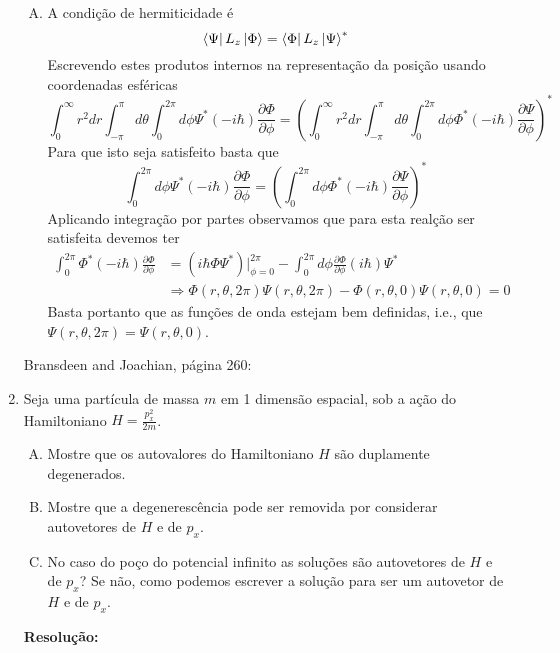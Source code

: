 \documentclass[a4paper, 12pt, notitlepage]{article}
\begin{document}
\begin{enumerate}
\begin{enumerate}[(A)]
  \item A condição de hermiticidade é
  \[
    \bra{\Psi}L_z\ket{\Phi} = \bra{\Phi}L_z\ket{\Psi}^{\ast}
  \]
  Escrevendo estes produtos internos na representação da posição usando coordenadas esféricas
  \[
    \int_0^\infty r^2 dr \int_{-\pi}^{\pi} d\theta \int_0^{2\pi} d\phi \Psi^{\ast} (-i\hbar) \frac{\partial \Phi}{\partial \phi} = \left(\int_0^\infty r^2 dr \int_{-\pi}^{\pi} d\theta \int_0^{2\pi} d\phi \Phi^{\ast} (-i\hbar) \frac{\partial \Psi}{\partial \phi}\right)^{\ast}
  \]
  Para que isto seja satisfeito basta que
  \[
    \int_0^{2\pi} d\phi \Psi^{\ast}(-i\hbar)\frac{\partial \Phi}{\partial \phi} = \left(\int_0^{2\pi} d\phi \Phi^{\ast} (-i\hbar) \frac{\partial \Psi}{\partial \phi}\right)^{\ast}
  \]
  Aplicando integração por partes observamos que para esta realção ser satisfeita devemos ter
  \begin{align*}
    \int_0^{2\pi} \Phi^{\ast}(-i\hbar) \frac{\partial \Phi}{\partial \phi} &= (i\hbar\Phi \Psi^{\ast})\Big|_{\phi=0}^{2\pi} - \int_0^{2\pi} d\phi \frac{\partial\Phi}{\partial\phi}(i\hbar)\Psi^{\ast} \\
    &\Rightarrow \Phi(r, \theta, 2\pi)\Psi(r, \theta, 2\pi) - \Phi(r, \theta, 0)\Psi(r, \theta, 0) = 0
  \end{align*}
  Basta portanto que as funções de onda estejam bem definidas, i.e., que $\Psi(r, \theta, 2\pi) = \Psi(r, \theta, 0)$.
  
\end{enumerate}


Bransdeen and Joachian, página 260:
\item Seja uma partícula de massa $m$ em 1 dimensão espacial, sob a ação do Hamiltoniano $H = \frac{p_x^2}{2m}$.

\begin{enumerate}[(A)]
  \item Mostre que os autovalores do Hamiltoniano $H$ são duplamente degenerados.
  \item Mostre que a degenerescência pode ser removida por considerar autovetores de $H$ e de $p_x$.
  \item No caso do poço do potencial infinito as soluções são autovetores de $H$ e de $p_x$? Se não, como podemos escrever a solução para ser um autovetor de $H$ e de $p_x$.
\end{enumerate}

\textbf{Resolução: }


\end{enumerate}
\end{document}

